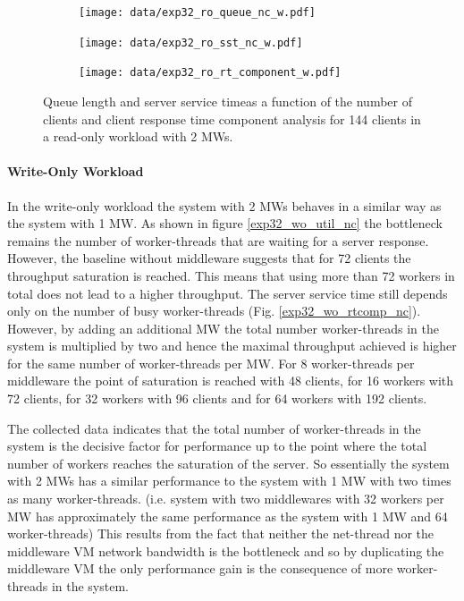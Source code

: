 \documentclass[report.tex]{subfiles}
\begin{document}
\begin{figure}[H]
	\begin{subfigure}[b]{.33\linewidth}
		\centering
		\texttt{[image: data/exp32\_ro\_queue\_nc\_w.pdf]}
		\caption{}\label{exp32_ro_q}
	\end{subfigure}\hfill
	\begin{subfigure}[b]{.33\linewidth}
		\centering
		\texttt{[image: data/exp32\_ro\_sst\_nc\_w.pdf]}
		\caption{}\label{exp32_ro_sst}
	\end{subfigure}\hfill
	\begin{subfigure}[b]{.33\linewidth}
		\centering
		\texttt{[image: data/exp32\_ro\_rt\_component\_w.pdf]}
		\caption{}\label{exp32_ro_rtcomp}
	\end{subfigure}
	\caption{Queue length and server service timeas a function of the number of clients and client response time component analysis for 144 clients  in a read-only workload with 2 MWs.}
\end{figure}
\vspace{-8mm}
\paragraph{Write-Only Workload}

In the write-only workload the system with 2 MWs behaves in a similar way as the system with 1 MW. 
As shown in figure \ref{exp32_wo_util_nc} the bottleneck remains the number of worker-threads that are waiting for a server response. 
However, the baseline without middleware suggests that for 72 clients the throughput saturation is reached. This means that using more than 72 workers in total does not lead to a higher throughput.
The server service time still depends only on the number of busy worker-threads (Fig. \ref{exp32_wo_rtcomp_nc}).
However, by adding an additional MW the total number worker-threads in the system is multiplied by two and hence the maximal throughput achieved is higher for the same number of worker-threads per MW.
For 8 worker-threads per middleware the point of saturation is reached with 48 clients, for 16 workers with 72 clients, for 32 workers with 96 clients and for 64 workers with 192 clients.

The collected data indicates that the total number of worker-threads in the system is the decisive factor for performance up to the point where the total number of workers reaches the saturation of the server.
So essentially the system with 2 MWs has a similar performance to the system with 1 MW with two times as many worker-threads. (i.e. system with two middlewares with 32 workers per MW has approximately the same performance as the system with 1 MW and 64 worker-threads)
This results from the fact that neither the net-thread nor the middleware VM network bandwidth is the bottleneck and so by duplicating the middleware VM the only performance gain is the consequence of more worker-threads in the system.
\end{document}
